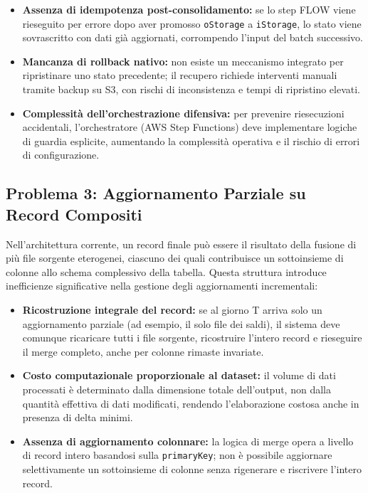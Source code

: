 \documentclass[12pt,a4paper,openright,twoside]{book}
\begin{document}
\begin{itemize}
    \item \textbf{Assenza di idempotenza post-consolidamento:} se lo step FLOW viene rieseguito per errore dopo aver promosso \texttt{oStorage} a \texttt{iStorage}, lo stato viene sovrascritto con dati già aggiornati, corrompendo l’input del batch successivo.
    \item \textbf{Mancanza di rollback nativo:} non esiste un meccanismo integrato per ripristinare uno stato precedente; il recupero richiede interventi manuali tramite backup su S3, con rischi di inconsistenza e tempi di ripristino elevati.
    \item \textbf{Complessità dell’orchestrazione difensiva:} per prevenire riesecuzioni accidentali, l’orchestratore (AWS Step Functions) deve implementare logiche di guardia esplicite, aumentando la complessità operativa e il rischio di errori di configurazione.
\end{itemize}


\subsection{Problema 3: Aggiornamento Parziale su Record Compositi}
Nell’architettura corrente, un record finale può essere il risultato della fusione di più file sorgente eterogenei, ciascuno dei quali contribuisce un sottoinsieme di colonne allo schema complessivo della tabella. Questa struttura introduce inefficienze significative nella gestione degli aggiornamenti incrementali:

\begin{itemize}
    \item \textbf{Ricostruzione integrale del record:} se al giorno T arriva solo un aggiornamento parziale (ad esempio, il solo file dei saldi), il sistema deve comunque ricaricare tutti i file sorgente, ricostruire l’intero record e rieseguire il merge completo, anche per colonne rimaste invariate.
    \item \textbf{Costo computazionale proporzionale al dataset:} il volume di dati processati è determinato dalla dimensione totale dell’output, non dalla quantità effettiva di dati modificati, rendendo l’elaborazione costosa anche in presenza di delta minimi.
    \item \textbf{Assenza di aggiornamento colonnare:} la logica di merge opera a livello di record intero basandosi sulla \texttt{primaryKey}; non è possibile aggiornare selettivamente un sottoinsieme di colonne senza rigenerare e riscrivere l’intero record.
\end{itemize}
\end{document}
